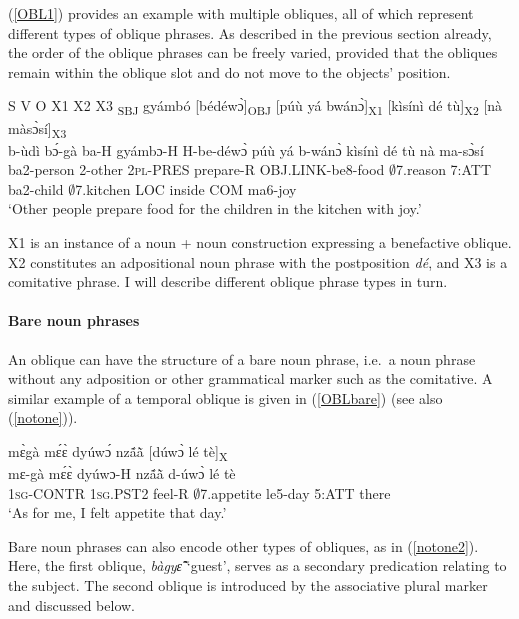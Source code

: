 \noindent (\ref{OBL1}) provides an example with multiple obliques, all of which represent different types of oblique phrases. As described in the previous section already, the order of the oblique phrases can be freely varied, provided that the obliques remain within the oblique slot and do not move to the objects' position. 

\begin{exe}
\ex\label{OBL1}  S V O X1 X2 X3
  \glll  [bùdì bɔ́gà bá]\textsubscript{SBJ} gyámbó [bédéwɔ̀]\textsubscript{OBJ} [púù yá bwánɔ̀]\textsubscript{X1} [kìsínì dé tù]\textsubscript{X2} [nà màsɔ̀sí]\textsubscript{X3}\\
         b-ùdì bɔ́-gà ba-H gyámbɔ-H H-be-déwɔ̀ púù yá b-wánɔ̀ kìsínì dé tù  nà ma-sɔ̀sí\\
        ba2-person 2-other 2\textsc{pl}-PRES prepare-R OBJ.LINK-be8-food $\emptyset$7.reason 7:ATT ba2-child $\emptyset$7.kitchen LOC inside COM ma6-joy\\
    \trans `Other people prepare food for the children in the kitchen with joy.'
\end{exe}

\noindent X1 is an instance of a noun + noun construction expressing a benefactive oblique. X2 constitutes an adpositional noun phrase with the postposition {\itshape dé}, and X3 is a comitative phrase. I will describe different oblique phrase types in turn.

\paragraph{Bare noun phrases}

An oblique can have the structure of a bare noun phrase, i.e.\  a noun phrase without any adposition or other grammatical marker such as  the comitative. A similar example of a temporal oblique is given in (\ref{OBLbare}) (see also (\ref{notone})).

\begin{exe} 
\ex\label{OBLbare} 
  \glll mɛ̀gà mɛ́ɛ̀ dyúwɔ́ nzã́ã̀ [dúwɔ̀ lé tè]\textsubscript{X} \\
       mɛ-gà mɛ́ɛ̀ dyúwɔ-H nzã́ã̀ d-úwɔ̀ lé tè \\
         1\textsc{sg}-CONTR 1\textsc{sg}.PST2 feel-R $\emptyset$7.appetite le5-day 5:ATT there \\
    \trans `As for me, I felt appetite that day.'
\end{exe}

Bare noun phrases can also encode other types of obliques, as in (\ref{notone2}). Here, the first oblique, {\itshape bàgyɛ̃̂} `guest', serves as a secondary predication relating to the subject. The second oblique is introduced by the associative plural marker and discussed below.

